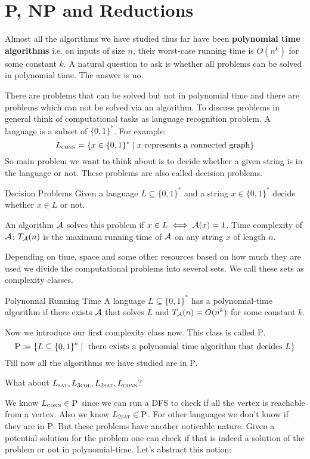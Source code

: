 \chapter{\textsc{P, NP} and Reductions}
Almost all the algorithms we have studied thus far have been \textbf{polynomial time algorithms} i.e. on inputs of size $n$, their worst-case running time is $O(n^k)$ for some constant $k$. A natural question to ask is whether all problems can be solved in polynomial time. The answer is no. 
 
There are problems that can be solved but not in polynomial time and there are problems which can not be solved via an algorithm. To discuss problems in general think of computational tasks as language recognition problem. A language is a subset of $\{0,1\}^*$. For example: $$L_{\textsc{conn}}=\{x\in\{0,1\}^*\mid x\text{ represents a connected graph}\}$$So main problem we want to think about is to decide whether a given string is in the language or not. These problems are also called decision problems. 
\begin{definition}{Decision Problems}{}
Given a language $L\subseteq \{0,1\}^*$ and a string $x\in\{0,1\}^*$ decide whether $x\in L$ or not. 
\end{definition}    An algorithm $\mathcal{A}$ solves this problem if $x\in L\iff \mathcal{A}(x)=1$. Time complexity of $\mathcal{A}$: $T_{\mathcal{A}}(n)$ is the maximum running time of $\mathcal{A}$ on any string $x$ of length $n$. 

Depending on time, space and some other resources based on how much they are used we divide the computational problems into several sets. We call these sets as complexity classes.

\begin{definition}{Polynomial Running Time}{}
A language $L\subseteq\{0,1\}^*$ has a polynomial-time algorithm if there exists $\mathcal{A}$ that solves $L$ and $T_{\mathcal{A}}(n)=O(n^k)$ for some constant $k$. 
\end{definition}
Now we introduce our first complexity class now. This class is called \textsc{P}. $$\textsc{P}\coloneqq \{L\subseteq \{0,1\}^*\mid \text{ there exists a polynomial time algorithm that decides $L$}\}$$ Till now all the algorithms we have studied are in \textsc{P}. 
\begin{question}{}{}
    What about $L_{\textsc{sat}}, L_{\textsc{3col}}, L_{\textsc{2sat}}, L_{\textsc{conn}}$?
\end{question}We know $L_{\textsc{conn}}\in \textsc{P}$ since we can run a \textsc{DFS} to check if all the vertex is reachable from a vertex. Also we know $L_{\textsc{2sat}}\in \textsc{P}$. For other languages we don't know if they are in \textsc{P}. But these problems have another noticable nature. Given a potential solution for the problem one can check if that is indeed a solution of the problem or not in polynomial-time. Let's abstract this notion: 

